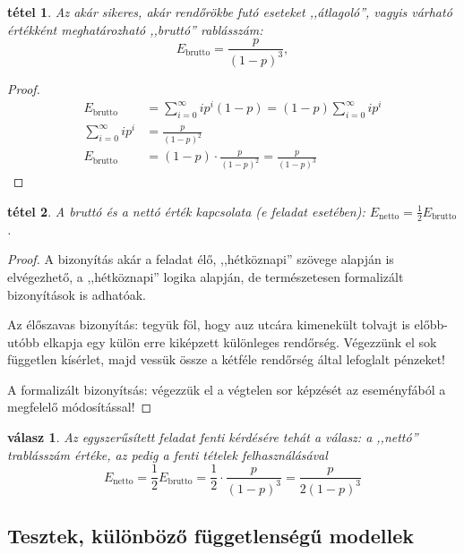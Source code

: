 \documentclass{article}
\newtheorem{theorem}{tétel}
\newtheorem{answer}{válasz}
\newcommand{\parenthesed}[1]{\left(#1\right)}
\newcommand{\expvalnet}{E_{\text{netto}}}
\newcommand{\expvalgro}{E_{\text{brutto}}}
\begin{document}
	\begin{theorem}
		Az akár sikeres, akár rendőrökbe futó eseteket ,,átlagoló'', vagyis várható értékként meghatározható ,,bruttó'' rablásszám:
		\begin{equation}
			\expvalgro = \frac p{\parenthesed{1-p}^3},
		\end{equation}
	\end{theorem}
	\begin{proof}
		\begin{align}
			\expvalgro             &= \sum_{i=0}^\infty ip^i\parenthesed{1-p} = \parenthesed{1-p}\sum_{i=0}^\infty ip^i\\
			\sum_{i=0}^\infty ip^i &= \frac p{\parenthesed{1-p}^2}\\
			\expvalgro             &= \parenthesed{1-p} \cdot \frac p{\parenthesed{1-p}^2} = \frac p{\parenthesed{1-p}^3}
		\end{align}
	\end{proof}
	\begin{theorem}
		A bruttó és a nettó érték kapcsolata (e feladat esetében): $\expvalnet = \frac12\expvalgro$.
	\end{theorem}
	\begin{proof}
		A bizonyítás akár a feladat élő, ,,hétköznapi'' szövege alapján is elvégezhető, a ,,hétköznapi'' logika alapján, de természetesen formalizált bizonyítások is adhatóak.

		Az élőszavas bizonyítás: tegyük föl, hogy auz utcára kimenekült tolvajt is előbb-utóbb elkapja egy külön erre kiképzett különleges rendőrség.
		Végezzünk el sok független kísérlet, majd vessük össze a kétféle rendőrség által lefoglalt pénzeket!

		A formalizált bizonyítsás: végezzük el a végtelen sor képzését az eseményfából a megfelelő módosítással!
	\end{proof}

	\begin{answer}
		Az egyszerűsített feladat fenti kérdésére tehát a válasz: a ,,nettó'' trablásszám értéke, az pedig a fenti tételek felhasználásával
		\begin{equation}
			\expvalnet = \frac12\expvalgro = \frac12\cdot\frac p{\parenthesed{1-p}^3} = \frac p{2\parenthesed{1-p}^3}
		\end{equation}
	\end{answer}


	\subsection{Tesztek, különböző függetlenségű modellek}
\end{document}

